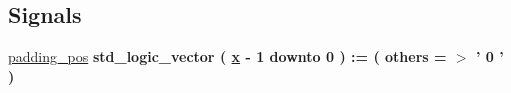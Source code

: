 \subsection*{Signals}
 \begin{DoxyCompactItemize}
\item 
\hypertarget{classtruncate_1_1dataflow_gac257856843ad01f95857ccecfea5e47e}{\hyperlink{group___truncation_gac257856843ad01f95857ccecfea5e47e}{padding\+\_\+pos} {\bfseries \textcolor{vhdlchar}{std\+\_\+logic\+\_\+vector}\textcolor{vhdlchar}{ }\textcolor{vhdlchar}{(}\textcolor{vhdlchar}{ }\textcolor{vhdlchar}{ }\textcolor{vhdlchar}{ }\textcolor{vhdlchar}{ }{\bfseries \hyperlink{group___truncation_ga63701d8af27da7452a7588efcff357bc}{x}} \textcolor{vhdlchar}{-\/}\textcolor{vhdlchar}{ } \textcolor{vhdldigit}{1} \textcolor{vhdlchar}{ }\textcolor{vhdlchar}{downto}\textcolor{vhdlchar}{ }\textcolor{vhdlchar}{ } \textcolor{vhdldigit}{0} \textcolor{vhdlchar}{ }\textcolor{vhdlchar}{)}\textcolor{vhdlchar}{ }\textcolor{vhdlchar}{ }\textcolor{vhdlchar}{ }\textcolor{vhdlchar}{\+:}\textcolor{vhdlchar}{=}\textcolor{vhdlchar}{ }\textcolor{vhdlchar}{(}\textcolor{vhdlchar}{ }\textcolor{vhdlchar}{ }\textcolor{vhdlchar}{others}\textcolor{vhdlchar}{ }\textcolor{vhdlchar}{ }\textcolor{vhdlchar}{=}\textcolor{vhdlchar}{ }\textcolor{vhdlchar}{$>$}\textcolor{vhdlchar}{ }\textcolor{vhdlchar}{'}\textcolor{vhdlchar}{ } \textcolor{vhdldigit}{0} \textcolor{vhdlchar}{ }\textcolor{vhdlchar}{'}\textcolor{vhdlchar}{ }\textcolor{vhdlchar}{)}\textcolor{vhdlchar}{ }} }\label{classtruncate_1_1dataflow_gac257856843ad01f95857ccecfea5e47e}


\end{DoxyCompactItemize}
